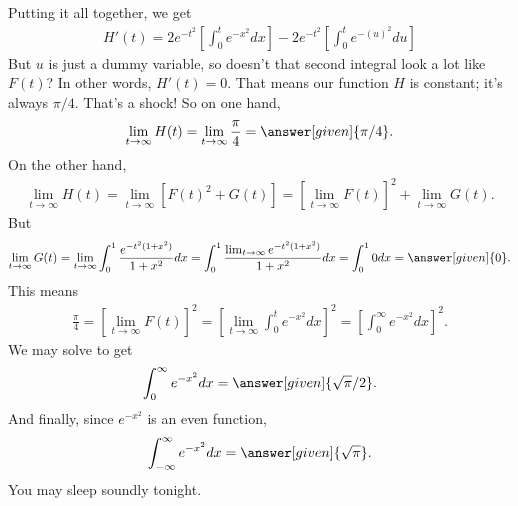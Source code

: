\documentclass{ximera}
\begin{document}
\begin{exercise}
\begin{exercise}
		\begin{exercise}
			Putting it all together, we get
			\begin{align*}
				H'(t)=2e^{-t^2} \left[ \int_{0}^{t} e^{-x^2}dx \right] -2e^{-t^2} \left[ \int_{0}^{t} e^{-(u)^2}du \right]
			\end{align*}
			But $u$ is just a dummy variable, so doesn't that second integral look a lot like $F(t)$? In other words, $H'(t)=0$. That means our function $H$ is constant; it's always $\pi/4$. That's a shock! So on one hand,
			\begin{align*}
				\lim_{t \to \infty} H(t) = \lim_{t \to \infty} \frac{\pi}{4} = \answer[given]{\pi/4}.
			\end{align*}
			On the other hand,
			\begin{align*}
				\lim_{t \to \infty} H(t) = \lim_{t \to \infty} \left[ F(t)^2+G(t) \right] = \left[\lim_{t \to \infty} F(t) \right]^2 + \lim_{t \to \infty} G(t).
			\end{align*}
			But
			\begin{align*}
				\lim_{t \to \infty} G(t) = \lim_{t \to \infty} \int_{0}^{1} \frac{e^{-t^2(1+x^2)}}{1+x^2} dx = \int_{0}^{1} \frac{ \lim_{t \to \infty} e^{-t^2(1+x^2)}}{1+x^2} dx = \int_{0}^{1} 0 dx = \answer[given]{0}.
			\end{align*}
			This means
			\begin{align*}
				\frac{\pi}{4} = \left[\lim_{t \to \infty} F(t) \right]^2 = \left[\lim_{t \to \infty} \int_{0}^{t} e^{-x^2} dx \right]^2=\left[ \int_{0}^{\infty} e^{-x^2} dx \right]^2.
			\end{align*}
			We may solve to get
			\begin{align*}
				\int_{0}^{\infty} e^{-x^2} dx = \answer[given]{\sqrt{\pi}/2}.
			\end{align*}			
			And finally, since $e^{-x^2}$ is an even function,
			\begin{align*}
				\int_{-\infty}^{\infty} e^{-x^2} dx = \answer[given]{\sqrt{\pi}}.
			\end{align*}
			You may sleep soundly tonight.
			
			
		\end{exercise}
		
	
	\end{exercise}


\end{exercise}
\end{document}
